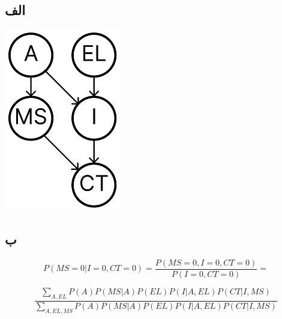 \subsection*{الف}

\begin{center}
	\includegraphics{graph.png}
\end{center}


\subsection*{ب}

$$P(MS = 0 | I = 0 , CT = 0) = \frac{P(MS = 0 , I = 0 , CT = 0)}{P(I = 0 , CT = 0)} =$$

$$\frac{\sum_{A, EL}^{} P(A) P(MS | A) P(EL) P(I | A , EL) P(CT | I, MS)}{\sum_{A, EL, MS}^{} P(A) P(MS | A) P(EL) P(I | A , EL) P(CT | I, MS)}$$